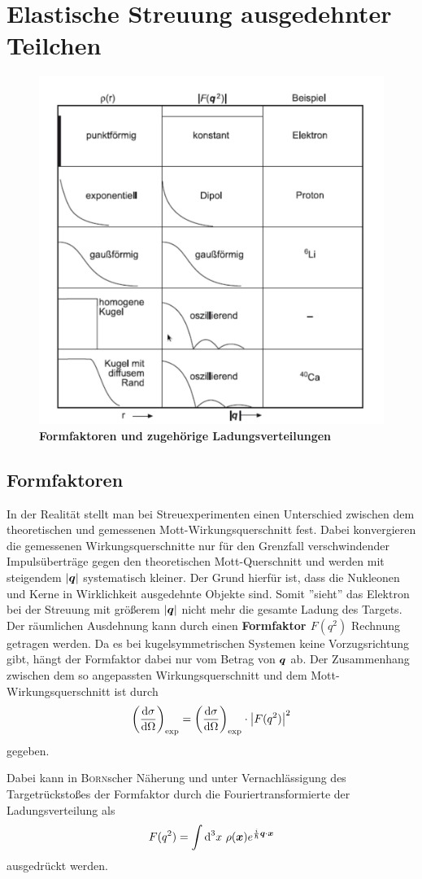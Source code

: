 \section{Elastische Streuung ausgedehnter Teilchen}

\begin{figure}
	\centering
	\includegraphics[width=.5\textwidth]{./img/formfaktoren_rho.jpeg}
	\caption{\textbf{Formfaktoren und zugehörige Ladungsverteilungen}}
	\label{fig:formfaktoren}
\end{figure}

\subsection{Formfaktoren}
In der Realität stellt man bei Streuexperimenten einen Unterschied zwischen dem theoretischen und gemessenen Mott-Wirkungsquerschnitt fest.
Dabei konvergieren die gemessenen Wirkungsquerschnitte nur für den Grenzfall verschwindender Impulsüberträge gegen den theoretischen Mott-Querschnitt und werden mit steigendem $|\mvec{q}|$ systematisch kleiner.
Der Grund hierfür ist, dass die Nukleonen und Kerne in Wirklichkeit ausgedehnte Objekte sind.
Somit ''sieht'' das Elektron bei der Streuung mit größerem $|\mvec{q}|$ nicht mehr die gesamte Ladung des Targets.
Der räumlichen Ausdehnung kann durch einen \textbf{Formfaktor $F(q^2)$} Rechnung getragen werden.
Da es bei kugelsymmetrischen Systemen keine Vorzugsrichtung gibt, hängt der Formfaktor dabei nur vom Betrag von $\mvec{q}$ ab.
Der Zusammenhang zwischen dem so angepassten Wirkungsquerschnitt und dem Mott-Wirkungsquerschnitt ist durch
\begin{equation*}
	\left(\diff[\sigma]{\Omega}\right)_\text{exp} = \left(\diff[\sigma]{\Omega}\right)_\text{exp}\cdot \left|F(q^2)\right|^2
\end{equation*}
gegeben.

Dabei kann in \textsc{Born}scher Näherung und unter Vernachlässigung des Targetrückstoßes der Formfaktor durch die Fouriertransformierte der Ladungsverteilung als
\begin{equation*}
	F(q^2) = \int{\text{d}^3x\ \rho(\mvec{x})e^{\frac{i}{\hbar}\mvec{q}\cdot\mvec{x}}}
\end{equation*}
ausgedrückt werden.

